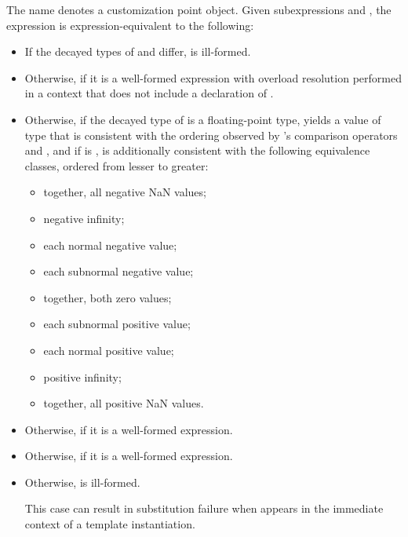 %
\pnum
The name  denotes
a customization point object.
Given subexpressions  and ,
the expression 
is expression-equivalent to the following:
\begin{itemize}
\item
  If the decayed types of  and  differ,
   is ill-formed.
\item
  Otherwise, 
  if it is a well-formed expression
  with overload resolution performed in a context
  that does not include a declaration of .
\item
  Otherwise, if the decayed type  of 
  is a floating-point type,
  yields a value of type 
  that is consistent with the ordering
  observed by 's comparison operators and , and
  if  is ,
  is additionally consistent with the following equivalence classes,
  ordered from lesser to greater:
  \begin{itemize}
  \item together, all negative NaN values;
  \item negative infinity;
  \item each normal negative value;
  \item each subnormal negative value;
  \item together, both zero values;
  \item each subnormal positive value;
  \item each normal positive value;
  \item positive infinity;
  \item together, all positive NaN values.
  \end{itemize}
\item
  Otherwise, 
  if it is a well-formed expression.
\item
  Otherwise, 
  if it is a well-formed expression.
\item
  Otherwise,  is ill-formed.
  \begin{note}
  This case can result in substitution failure
  when  appears in the immediate context
  of a template instantiation.
  \end{note}
\end{itemize}

